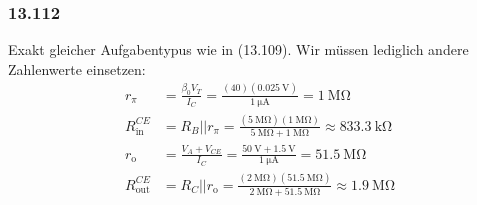 \documentclass[11pt,a4paper,titlepage]{article}
\begin{document}
\subsubsection*{13.112}
Exakt gleicher Aufgabentypus wie in (13.109). Wir müssen lediglich andere Zahlenwerte einsetzen:
\begin{equation}
\begin{aligned}
r_{\pi} &= \frac{\beta_0V_T}{I_C} = \frac{(40)(\SI{0.025}{\volt})}{\SI{1}{\micro\ampere}} = \SI{1}{\mega\ohm} \\
R_{\text{in}}^{CE} &= R_B || r_{\pi} =  \frac{(\SI{5}{\mega\ohm})(\SI{1}{\mega\ohm})}{\SI{5}{\mega\ohm}+\SI{1}{\mega\ohm}} \approx \SI{833.3}{\kilo\ohm} \\
r_{\text{o}} &= \frac{V_A+V_{CE}}{I_C} = \frac{\SI{50}{\volt} + \SI{1.5}{\volt}}{\SI{1}{\micro\ampere}} = \SI{51.5}{\mega\ohm} \\
R_{\text{out}}^{CE} &= R_C || r_{\text{o}} = \frac{(\SI{2}{\mega\ohm})(\SI{51.5}{\mega\ohm})}{\SI{2}{\mega\ohm} + \SI{51.5}{\mega\ohm}} \approx \SI{1.9}{\mega\ohm}
\end{aligned}
\end{equation}
\end{document}
